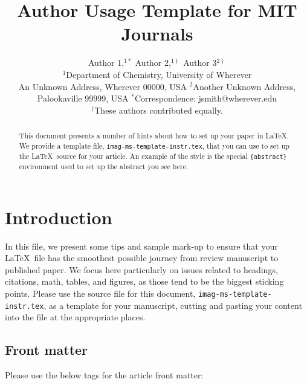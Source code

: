 \documentclass[]{imag-ms-template}
\title{Author Usage Template for MIT Journals}
\author{
    Author 1,$^{1\ast}$
    Author 2,$^{1\dag}$
    Author 3$^{2\dag}$
\\
{\small $^{1}$Department of Chemistry, University of Wherever}\\
{\small An Unknown Address, Wherever 00000, USA}
{\small $^{2}$Another Unknown Address, Palookaville 99999, USA}
{\small $^\ast$Correspondence: jsmith@wherever.edu}\\
{\small $^\dag$These authors contributed equally.}\\
}
\theoremstyle{plain}
\theoremstyle{remark}
\begin{document}
\maketitle
\begin{abstract}
This document presents a number of hints about how to set up your paper
in \LaTeX. We provide a template file,
\texttt{imag-ms-template-instr.tex}, that you can use to set up the
\LaTeX~source for your article. An example of the style is the special
\texttt{\{abstract\}} environment used to set up the abstract you see
here.
\end{abstract}

\section{Introduction}\label{introduction}

In this file, we present some tips and sample mark-up to ensure that
your \LaTeX~file has the smoothest possible journey from review
manuscript to published paper. We focus here particularly on issues
related to headings, citations, math, tables, and figures, as those tend
to be the biggest sticking points. Please use the source file for this
document, \texttt{imag-ms-template-instr.tex}, as a template for your
manuscript, cutting and pasting your content into the file at the
appropriate places.

\newpage{}

\subsection{Front matter}\label{front-matter}

Please use the below tags for the article front matter:
\end{document}
